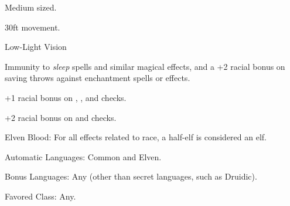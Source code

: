 
\begin{itemize*}
\item Medium sized.
\item 30ft movement.
\item Low-Light Vision
\item Immunity to \textit{sleep} spells and similar magical effects, and a +2 racial bonus on saving throws against enchantment spells or effects.
\item +1 racial bonus on , , and  checks.
\item +2 racial bonus on  and  checks.
\item Elven Blood: For all effects related to race, a half-elf is considered an elf.
\item Automatic Languages: Common and Elven.
\item Bonus Languages: Any (other than secret languages, such as Druidic).
\item Favored Class: Any.
\end{itemize*}

